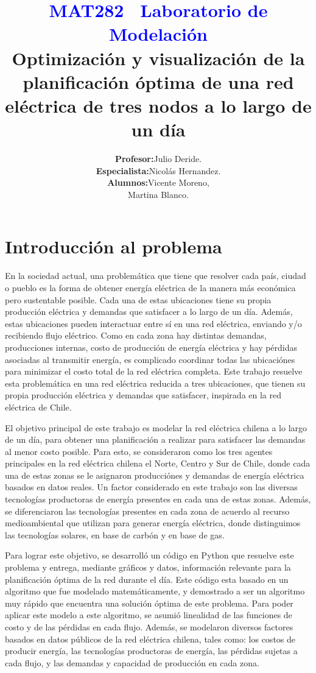 \documentclass[12pt,twoside]{article}
\title{\textbf{\textcolor{blue}{MAT282 \textthreequartersemdash\ Laboratorio de Modelaci\'on }}\color{gray} \\ Optimizaci\'on y visualizaci\'on de la planificaci\'on \'optima de una red el\'ectrica de tres nodos a lo largo de un d\'ia}
\author{\begin{tabular}{rl}
		\textbf{Profesor:} & Julio Deride.\\
		\textbf{Especialista:} & Nicol\'as Hernandez. \\
		\textbf{Alumnos:} & Vicente Moreno, \\
		& Martina Blanco.
\end{tabular}}
\date{}
\begin{document}
	
	\maketitle
	\color{black}
	
	\newpage
	
	\renewcommand\contentsname{Indice}
	\tableofcontents

	
	\newpage
	
	\section{Introducci\'on al problema}
	
	\hspace{1cm} En la sociedad actual, una problem\'atica que tiene que resolver cada pa\'is, ciudad o pueblo es la forma de obtener energía el\'ectrica de la manera más económica pero sustentable posible. Cada una de estas ubicaciones tiene su propia producci\'on el\'ectrica y demandas que satisfacer a lo largo de un d\'ia. Adem\'as, estas ubicaciones pueden interactuar entre s\'i en una red el\'ectrica, enviando y/o recibiendo flujo el\'ectrico. Como en cada zona hay distintas demandas, producciones internas, costo de producci\'on de energ\'ia el\'ectrica y hay p\'erdidas asociadas al transmitir energ\'ia, es complicado coordinar todas las ubicaci\'ones para minimizar el costo total de la red el\'ectrica completa. Este trabajo resuelve esta problem\'atica en una red el\'ectrica reducida a tres ubicaciones, que tienen su propia producci\'on el\'ectrica y demandas que satisfacer, inspirada en la red el\'ectrica de Chile.
	
	El objetivo principal de este trabajo es modelar la red el\'ectrica chilena a lo largo de un d\'ia, para obtener una planificaci\'on a realizar para satisfacer las demandas al menor costo posible. Para esto, se consideraron como los tres agentes principales en la red el\'ectrica chilena el Norte, Centro y Sur de Chile, donde cada una de estas zonas se le asignaron producci\'ones y demandas de energ\'ia el\'ectrica basados en datos reales. Un factor considerado en este trabajo son las diversas tecnolog\'ias productoras de energía presentes en cada una de estas zonas. Adem\'as, se diferenciaron las tecnolog\'ias presentes en cada zona de acuerdo al recurso medioambiental que utilizan para generar energ\'ia el\'ectrica, donde distinguimos las tecnolog\'ias solares, en base de carb\'on y en base de gas.
	
	Para lograr este objetivo, se desarroll\'o un c\'odigo en Python que resuelve este problema y entrega, mediante gr\'aficos y datos, informaci\'on relevante para la planificaci\'on \'optima de la red durante el d\'ia. Este c\'odigo esta basado en un algoritmo que fue modelado matemáticamente, y demostrado a ser un algoritmo muy r\'apido que encuentra una soluci\'on \'optima de este problema. Para poder aplicar este modelo a este algoritmo, se asumi\'o linealidad de las funciones de costo y de las p\'erdidas en cada flujo. Adem\'as, se modelaron diversos factores basados en datos p\'ublicos de la red el\'ectrica chilena, tales como: los costos de producir energ\'ia, las tecnolog\'ias productoras de energ\'ia, las pérdidas sujetas a cada flujo, y las demandas y capacidad de producción en cada zona.
	
\end{document}
